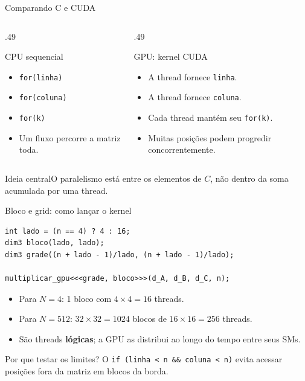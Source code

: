 \documentclass[aspectratio=169,11pt]{beamer}
\newcommand{\ideia}[1]{\begin{block}{Ideia central}#1\end{block}}
\begin{document}
\begin{frame}{Comparando C e CUDA}
\begin{columns}[T]
\begin{column}{.49\linewidth}
\begin{block}{CPU sequencial}
\begin{itemize}
\item \texttt{for(linha)}
\item \texttt{for(coluna)}
\item \texttt{for(k)}
\item Um fluxo percorre a matriz toda.
\end{itemize}
\end{block}
\end{column}
\begin{column}{.49\linewidth}
\begin{block}{GPU: kernel CUDA}
\begin{itemize}
\item A thread fornece \texttt{linha}.
\item A thread fornece \texttt{coluna}.
\item Cada thread mantém seu \texttt{for(k)}.
\item Muitas posições podem progredir concorrentemente.
\end{itemize}
\end{block}
\end{column}
\end{columns}
\vspace{3mm}
\ideia{O paralelismo está entre os elementos de \(C\), não dentro da soma acumulada por uma thread.}
\end{frame}

\begin{frame}[fragile]{Bloco e grid: como lançar o kernel}
\begin{lstlisting}[style=prog]
int lado = (n == 4) ? 4 : 16;
dim3 bloco(lado, lado);
dim3 grade((n + lado - 1)/lado, (n + lado - 1)/lado);

multiplicar_gpu<<<grade, bloco>>>(d_A, d_B, d_C, n);
\end{lstlisting}
\begin{itemize}
\item Para \(N=4\): 1 bloco com \(4\times4=16\) threads.
\item Para \(N=512\): \(32\times32=1024\) blocos de \(16\times16=256\) threads.
\item São threads \textbf{lógicas}; a GPU as distribui ao longo do tempo entre seus SMs.
\end{itemize}
\begin{alertblock}{Por que testar os limites?}
O \texttt{if (linha < n \&\& coluna < n)} evita acessar posições fora da matriz em blocos da borda.
\end{alertblock}
\end{frame}
\end{document}
